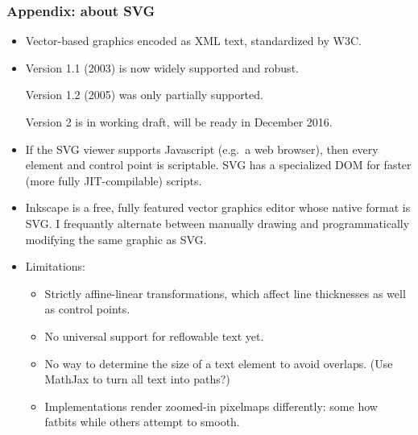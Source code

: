 \documentclass[compress]{beamer}
\begin{document}
\begin{frame}
\frametitle{Appendix: about SVG}

\vspace{-0.1 cm}
\begin{itemize}
\item Vector-based graphics encoded as XML text, standardized by W3C.
\item Version 1.1 (2003) is now widely supported and robust.

Version 1.2 (2005) was only partially supported.

Version 2 is in working draft, will be ready in December 2016.

\item If the SVG viewer supports Javascript (e.g.\ a web browser), then every element and control point is scriptable. SVG has a specialized DOM for faster (more fully JIT-compilable) scripts.

\item Inkscape is a free, fully featured vector graphics editor whose native format is SVG. I frequantly alternate between manually drawing and programmatically modifying the same graphic as SVG.

\item Limitations:
\begin{itemize}
\item Strictly affine-linear transformations, which affect line thicknesses as well as control points.
\item No universal support for reflowable text yet.
\item No way to determine the size of a text element to avoid overlaps. (Use MathJax to turn all text into paths?)
\item Implementations render zoomed-in pixelmaps differently: some how fatbits while others attempt to smooth.
\end{itemize}

\end{itemize}
\end{frame}
\end{document}
